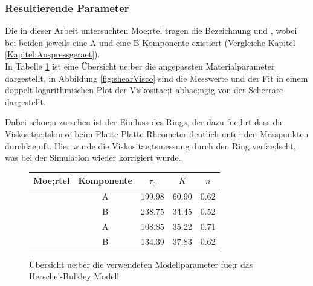 \subsubsection{Resultierende Parameter}
Die in dieser Arbeit untersuchten Moe;rtel tragen die Bezeichnung \hit{} und \re{}, wobei bei beiden jeweils eine A und eine B Komponente existiert (Vergleiche Kapitel \ref{Kapitel:Auspressgeraet}).\\
In Tabelle \ref{fig:resultParameter} ist eine Übersicht ue;ber die angepassten Materialparameter dargestellt, in Abbildung \ref{fig:shearVisco} sind die Messwerte und der Fit in einem doppelt logarithmischen Plot der Viskositae;t abhae;ngig von der Scherrate dargestellt.

Dabei schoe;n zu sehen ist der Einfluss des Rings, der dazu fue;hrt dass die Viskositae;tskurve beim Platte-Platte Rheometer deutlich unter den Messpunkten durchlae;uft.
Hier wurde die Viskositae;tsmessung durch den Ring verfae;lscht, was bei der Simulation wieder korrigiert wurde.
\begin{figure}
    \centering
    \begin{tabular}{l c l l l}
        \textbf{Moe;rtel} & \textbf{Komponente} & 
        \multicolumn{1}{c}{$\tau_0$} &
        \multicolumn{1}{c}{$K$} &
        \multicolumn{1}{c}{$n$} \\
        \hline
        \hline
        \multirow{2}{*}{\hit{}} & A & 199.98& 60.90& 0.62\\ 
        & B & 238.75& 34.45& 0.52\\ 
        \hline
        \multirow{2}{*}{\re{}}  & A & 108.85& 35.22& 0.71\\ 
        & B & 134.39& 37.83& 0.62
    \end{tabular}
    \caption{Übersicht ue;ber die verwendeten Modellparameter fue;r das Herschel-Bulkley Modell}
    \label{fig:resultParameter}
\end{figure}
%
